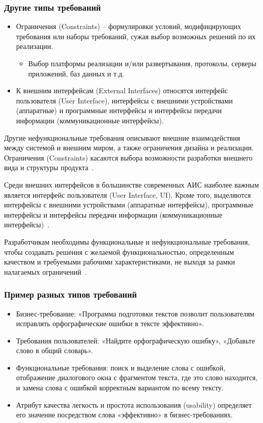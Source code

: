 \documentclass{../industrial-development}
\begin{document}
\begin{frame} \frametitle{Другие типы требований}
	\begin{itemize}
\item \alert{Ограничения (Constraints)} -- формулировки условий, модифицирующих требования или наборы требований, сужая выбор возможных решений по их реализации.
\begin{itemize}
	\item Выбор платформы реализации и/или развертывания, протоколы, серверы приложений, баз
данных и т.д.
\end{itemize}
\item К \alert{внешним интерфейсам (External Interfaces)} относятся интерфейс пользователя (User Interface), интерфейсы с внешними устройствами (аппаратные) и программные интерфейсы и интерфейсы передачи информации (коммуникационные интерфейсы).
	\end{itemize}
	\end{frame}

\lecturenotes

Другие нефункциональные требования описывают внешние
взаимодействия между системой и внешним миром, а также ограничения дизайна и реализации. \alert{Ограничения (Constraints)} касаются выбора
возможности разработки внешнего вида и структуры продукта~\cite[с.~10]{Wiegers}.

Среди \alert{внешних интерфейсов} в большинстве современных АИС наиболее важным является интерфейс пользователя (User Interface, UI). Кроме того, выделяются интерфейсы с внешними устройствами (аппаратные интерфейсы), программные интерфейсы и
интерфейсы передачи информации (коммуникационные интерфейсы)~\cite[с.~10]{Maglinec}.

Разработчикам необходимы функциональные и нефункциональные требования, чтобы создавать
решения с желаемой функциональностью, определенным качеством и требуемыми рабочими характеристиками, не выходя за рамки налагаемых ограничений~\cite[с.~11]{Wiegers}.


\begin{frame} \frametitle{Пример разных типов требований}
	\begin{itemize}
	\item \alert{Бизнес-требование}: «Программа подготовки текстов позволит пользователям исправлять орфографические ошибки в тексте эффективно».
	\item \alert{Требования пользователей}: «Найдите орфографическую ошибку», «Добавьте слово в общий словарь».
	\item \alert{Функциональные требования}: поиск и выделение слова с ошибкой, отображение диалогового окна с фрагментом текста, где это слово находится, и замена слова с ошибкой корректным вариантом по всему тексту.
	\item \alert{Атрибут качества} легкость и простота использования (usability) определяет его значение посредством слова «эффективно» в бизнес-требованиях.
	\end{itemize}
\end{frame}
\end{document}
